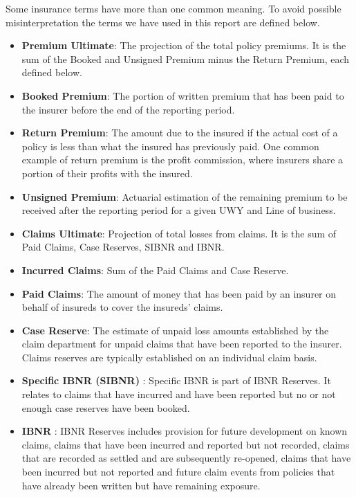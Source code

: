 
Some insurance terms have more than one common meaning. To avoid possible misinterpretation the terms we have used in this report are defined below.
\begin{itemize}
\item \textbf{Premium Ultimate}: The projection of the total policy premiums. It is the sum of the Booked and Unsigned Premium minus the Return Premium, each defined below.
\item \textbf{Booked Premium}: The portion of written premium that has been paid to the insurer before the end of the reporting period.
\item \textbf{Return Premium}: The amount due to the insured if the actual cost of a policy is less than what the insured has previously paid. One common example of return premium is the profit commission, where insurers share a portion of their profits with the insured.
\item \textbf{Unsigned Premium}: Actuarial estimation of the remaining premium to be received after the reporting period for a given UWY and Line of business.
\item \textbf{Claims Ultimate}: Projection of total losses from claims. It is the sum of Paid Claims, Case Reserves, SIBNR and IBNR.
\item \textbf{Incurred Claims}: Sum of the Paid Claims and Case Reserve.
\item \textbf{Paid Claims}: The amount of money that has been paid by an insurer on behalf of insureds to cover the insureds’ claims.
\item \textbf{Case Reserve}: The estimate of unpaid loss amounts established by the claim department for unpaid claims that have been reported to the insurer. Claims reserves are typically established on an individual claim basis.
\item \textbf{Specific IBNR (SIBNR)} : Specific IBNR is part of IBNR Reserves. It relates to claims that have incurred and have been reported but no or not enough case reserves have been booked.
\item \textbf{IBNR} : IBNR Reserves includes provision for future development on known claims, claims that have been incurred and reported but not recorded, claims that are recorded as settled and are subsequently re-opened, claims that have been incurred but not reported and future claim events from policies that have already been written but have remaining exposure.

\end{itemize}
